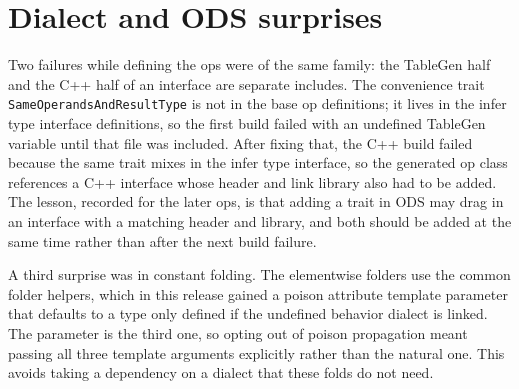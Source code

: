 \section{Dialect and ODS surprises}

Two failures while defining the ops were of the same family: the TableGen half and
the C++ half of an interface are separate includes. The convenience trait
\texttt{SameOperandsAndResultType} is not in the base op definitions; it lives in
the infer type interface definitions, so the first build failed with an undefined
TableGen variable until that file was included. After fixing that, the C++ build
failed because the same trait mixes in the infer type interface, so the generated
op class references a C++ interface whose header and link library also had to be
added. The lesson, recorded for the later ops, is that adding a trait in ODS may
drag in an interface with a matching header and library, and both should be added
at the same time rather than after the next build failure.

A third surprise was in constant folding. The elementwise folders use the common
folder helpers, which in this release gained a poison attribute template parameter
that defaults to a type only defined if the undefined behavior dialect is linked.
The parameter is the third one, so opting out of poison propagation meant passing
all three template arguments explicitly rather than the natural one. This avoids
taking a dependency on a dialect that these folds do not need.
